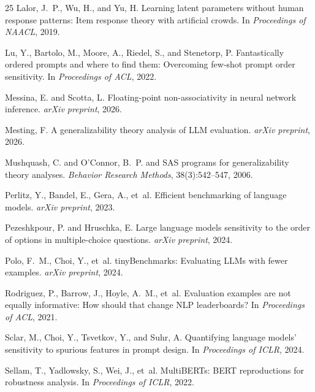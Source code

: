\documentclass[11pt]{article}
\begin{document}
\begin{thebibliography}{25}
Lalor, J.~P., Wu, H., and Yu, H.
\newblock Learning latent parameters without human response patterns: Item response theory with artificial crowds.
\newblock In \emph{Proceedings of NAACL}, 2019.

Lu, Y., Bartolo, M., Moore, A., Riedel, S., and Stenetorp, P.
\newblock Fantastically ordered prompts and where to find them: Overcoming few-shot prompt order sensitivity.
\newblock In \emph{Proceedings of ACL}, 2022.

Messina, E. and Scotta, L.
\newblock Floating-point non-associativity in neural network inference.
\newblock \emph{arXiv preprint}, 2026.

Mesting, F.
\newblock A generalizability theory analysis of {LLM} evaluation.
\newblock \emph{arXiv preprint}, 2026.

Mushquash, C. and O'Connor, B.~P.
 and {SAS} programs for generalizability theory analyses.
\newblock \emph{Behavior Research Methods}, 38(3):542--547, 2006.

Perlitz, Y., Bandel, E., Gera, A., et~al.
\newblock Efficient benchmarking of language models.
\newblock \emph{arXiv preprint}, 2023.

Pezeshkpour, P. and Hruschka, E.
\newblock Large language models sensitivity to the order of options in multiple-choice questions.
\newblock \emph{arXiv preprint}, 2024.

Polo, F.~M., Choi, Y., et~al.
\newblock tiny{B}enchmarks: Evaluating {LLM}s with fewer examples.
\newblock \emph{arXiv preprint}, 2024.

Rodriguez, P., Barrow, J., Hoyle, A.~M., et~al.
\newblock Evaluation examples are not equally informative: How should that change {NLP} leaderboards?
\newblock In \emph{Proceedings of ACL}, 2021.

Sclar, M., Choi, Y., Tsvetkov, Y., and Suhr, A.
\newblock Quantifying language models' sensitivity to spurious features in prompt design.
\newblock In \emph{Proceedings of ICLR}, 2024.

Sellam, T., Yadlowsky, S., Wei, J., et~al.
\newblock Multi{BERT}s: {BERT} reproductions for robustness analysis.
\newblock In \emph{Proceedings of ICLR}, 2022.


\end{thebibliography}
\end{document}
